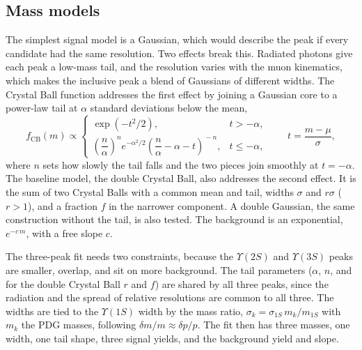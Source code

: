 \documentclass[a4paper,11pt]{article}
\newcommand{\Ups}[1]{\ensuremath{\Upsilon(#1)}}               %
\begin{document}
\subsection{Mass models}
\label{sec:m-models}

The simplest signal model is a Gaussian, which would describe the peak if every candidate had the same resolution.
Two effects break this.
Radiated photons give each peak a low-mass tail, and the resolution varies with the muon kinematics, which makes the inclusive peak a blend of Gaussians of different widths.
The Crystal Ball function addresses the first effect by joining a Gaussian core to a power-law tail at $\alpha$ standard deviations below the mean,
\begin{equation}
    f_\mathrm{CB}(m) \propto
    \begin{cases}
        \exp\!\left(-t^2/2\right), & t > -\alpha, \\[2pt]
        \left(\dfrac{n}{\alpha}\right)^{\!n} e^{-\alpha^2/2} \left(\dfrac{n}{\alpha} - \alpha - t\right)^{\!-n}, & t \leq -\alpha,
    \end{cases}
    \qquad t = \frac{m - \mu}{\sigma},
\end{equation}
where $n$ sets how slowly the tail falls and the two pieces join smoothly at $t = -\alpha$.
The baseline model, the double Crystal Ball, also addresses the second effect.
It is the sum of two Crystal Balls with a common mean and tail, widths $\sigma$ and $r\sigma$ ($r > 1$), and a fraction $f$ in the narrower component.
A double Gaussian, the same construction without the tail, is also tested.
The background is an exponential, $e^{-c\,m}$, with a free slope $c$.

The three-peak fit needs two constraints, because the \Ups{2S} and \Ups{3S} peaks are smaller, overlap, and sit on more background.
The tail parameters ($\alpha$, $n$, and for the double Crystal Ball $r$ and $f$) are shared by all three peaks, since the radiation and the spread of relative resolutions are common to all three.
The widths are tied to the \Ups{1S} width by the mass ratio, $\sigma_k = \sigma_{1S}\, m_k/m_{1S}$ with $m_k$ the PDG masses, following $\delta m/m \approx \delta p/p$.
The fit then has three masses, one width, one tail shape, three signal yields, and the background yield and slope.
\end{document}
